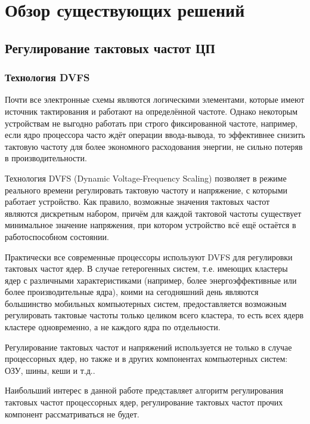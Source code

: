 \section{Обзор существующих решений}
\label{sec:Section2} 

\subsection{Регулирование тактовых частот ЦП}

\subsubsection{Технология DVFS} \label{DVFS_Chapter}

    Почти все электронные схемы являются логическими элементами, которые имеют источник тактирования
    и работают на определённой частоте. Однако некоторым устройствам не выгодно работать при
    строго фиксированной частоте, например, если ядро процессора часто ждёт операции ввода-вывода,
    то эффективнее снизить тактовую частоту для более экономного расходования энергии, не сильно
    потеряв в производительности.

    Технология DVFS (Dynamic Voltage-Frequency Scaling) позволяет в режиме реального времени
    регулировать тактовую частоту и напряжение, с которыми работает устройство. Как правило,
    возможные значения тактовых частот являются дискретным набором, причём для каждой тактовой частоты
    существует минимальное значение напряжения, при котором устройство всё ещё остаётся в
    работоспособном состоянии.

    Практически все современные процессоры используют DVFS для регулировки тактовых частот ядер. В случае
    гетерогенных систем, т.е. имеющих кластеры ядер с различными характеристиками (например, более
    энергоэффективные или более производительные ядра), коими на сегодняшний день являются
    большинство мобильных компьютерных систем, предоставляется возможным регулировать тактовые частоты
    только целиком всего кластера, то есть всех ядерв кластере одновременно, а не каждого ядра по отдельности.

    Регулирование тактовых частот и напряжений используется не только в случае процессорных ядер, но также
    и в других компонентах компьютерных систем: ОЗУ, шины, кеши и т.д..

    Наибольший интерес в данной работе представляет алгоритм регулирования тактовых частот процессорных
    ядер, регулирование тактовых частот прочих компонент рассматриваться не будет.


